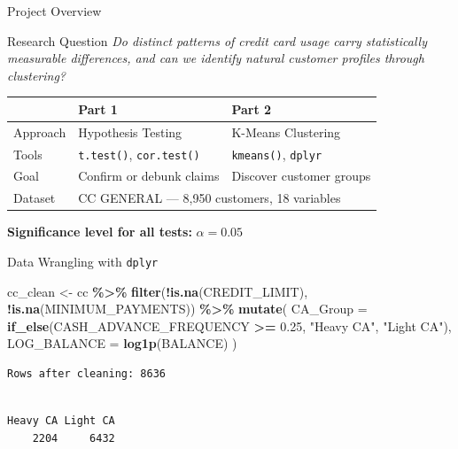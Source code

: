\documentclass[
  ignorenonframetext,
  aspectratio=169]{beamer}
\newenvironment{Shaded}{\begin{snugshade}}{\end{snugshade}}
\newcommand{\AttributeTok}[1]{\textcolor[rgb]{0.13,0.29,0.53}{#1}}
\newcommand{\FloatTok}[1]{\textcolor[rgb]{0.00,0.00,0.81}{#1}}
\newcommand{\FunctionTok}[1]{\textcolor[rgb]{0.13,0.29,0.53}{\textbf{#1}}}
\newcommand{\NormalTok}[1]{#1}
\newcommand{\OtherTok}[1]{\textcolor[rgb]{0.56,0.35,0.01}{#1}}
\newcommand{\SpecialCharTok}[1]{\textcolor[rgb]{0.81,0.36,0.00}{\textbf{#1}}}
\newcommand{\StringTok}[1]{\textcolor[rgb]{0.31,0.60,0.02}{#1}}
\begin{document}
\begin{frame}{Project Overview}
\protect{}\label{project-overview}
\begin{block}{Research Question}
\textit{Do distinct patterns of credit card usage carry statistically measurable
differences, and can we identify natural customer profiles through clustering?}
\end{block}

\vspace{0.4em}

\begin{tabular}{lll}
\toprule
 & \textbf{Part 1} & \textbf{Part 2} \\
\midrule
Approach & Hypothesis Testing & K-Means Clustering \\
Tools & \texttt{t.test()}, \texttt{cor.test()} & \texttt{kmeans()}, \texttt{dplyr} \\
Goal & Confirm or debunk claims & Discover customer groups \\
Dataset & \multicolumn{2}{l}{CC GENERAL --- 8,950 customers, 18 variables} \\
\bottomrule
\end{tabular}

\vspace{0.3em}

\textbf{Significance level for all tests:} \(\alpha = 0.05\)
\end{frame}

\begin{frame}[fragile]{Data Wrangling with \texttt{dplyr}}
\protect{}\label{data-wrangling-with-dplyr}
\begin{Shaded}
\begin{Highlighting}[]
\NormalTok{cc\_clean }\OtherTok{\textless{}{-}}\NormalTok{ cc }\SpecialCharTok{\%\textgreater{}\%}
  \FunctionTok{filter}\NormalTok{(}\SpecialCharTok{!}\FunctionTok{is.na}\NormalTok{(CREDIT\_LIMIT), }\SpecialCharTok{!}\FunctionTok{is.na}\NormalTok{(MINIMUM\_PAYMENTS)) }\SpecialCharTok{\%\textgreater{}\%}
  \FunctionTok{mutate}\NormalTok{(}
    \AttributeTok{CA\_Group    =} \FunctionTok{if\_else}\NormalTok{(CASH\_ADVANCE\_FREQUENCY }\SpecialCharTok{\textgreater{}=} \FloatTok{0.25}\NormalTok{,}
                          \StringTok{"Heavy CA"}\NormalTok{, }\StringTok{"Light CA"}\NormalTok{),}
    \AttributeTok{LOG\_BALANCE =} \FunctionTok{log1p}\NormalTok{(BALANCE)}
\NormalTok{  )}
\end{Highlighting}
\end{Shaded}

\vspace{0.5em}

\begin{verbatim}
Rows after cleaning: 8636 
\end{verbatim}

\begin{verbatim}

Heavy CA Light CA 
    2204     6432 
\end{verbatim}
\end{frame}
\end{document}
